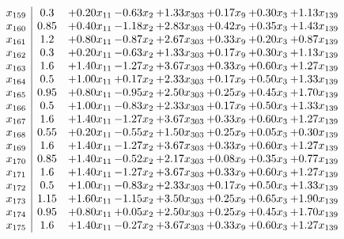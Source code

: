 \documentclass[8pt]{article}
\begin{document}
\[\begin{array}{c| c c@{\hskip 2pt} c@{\hskip 2pt} c@{\hskip 2pt} c@{\hskip 2pt} c@{\hskip 2pt} c@{\hskip 2pt} }
 x_{159}   &  0.3 & +  0.20 x_{11} & -0.63 x_{2} & +  1.33 x_{303} & +  0.17 x_{9} & +  0.30 x_{3} & +  1.13 x_{139}\\
 x_{160}   &  0.85 & +  0.40 x_{11} & -1.18 x_{2} & +  2.83 x_{303} & +  0.42 x_{9} & +  0.35 x_{3} & +  1.43 x_{139}\\
 x_{161}   &  1.2 & +  0.80 x_{11} & -0.87 x_{2} & +  2.67 x_{303} & +  0.33 x_{9} & +  0.20 x_{3} & +  0.87 x_{139}\\
 x_{162}   &  0.3 & +  0.20 x_{11} & -0.63 x_{2} & +  1.33 x_{303} & +  0.17 x_{9} & +  0.30 x_{3} & +  1.13 x_{139}\\
 x_{163}   &  1.6 & +  1.40 x_{11} & -1.27 x_{2} & +  3.67 x_{303} & +  0.33 x_{9} & +  0.60 x_{3} & +  1.27 x_{139}\\
 x_{164}   &  0.5 & +  1.00 x_{11} & +  0.17 x_{2} & +  2.33 x_{303} & +  0.17 x_{9} & +  0.50 x_{3} & +  1.33 x_{139}\\
 x_{165}   &  0.95 & +  0.80 x_{11} & -0.95 x_{2} & +  2.50 x_{303} & +  0.25 x_{9} & +  0.45 x_{3} & +  1.70 x_{139}\\
 x_{166}   &  0.5 & +  1.00 x_{11} & -0.83 x_{2} & +  2.33 x_{303} & +  0.17 x_{9} & +  0.50 x_{3} & +  1.33 x_{139}\\
 x_{167}   &  1.6 & +  1.40 x_{11} & -1.27 x_{2} & +  3.67 x_{303} & +  0.33 x_{9} & +  0.60 x_{3} & +  1.27 x_{139}\\
 x_{168}   &  0.55 & +  0.20 x_{11} & -0.55 x_{2} & +  1.50 x_{303} & +  0.25 x_{9} & +  0.05 x_{3} & +  0.30 x_{139}\\
 x_{169}   &  1.6 & +  1.40 x_{11} & -1.27 x_{2} & +  3.67 x_{303} & +  0.33 x_{9} & +  0.60 x_{3} & +  1.27 x_{139}\\
 x_{170}   &  0.85 & +  1.40 x_{11} & -0.52 x_{2} & +  2.17 x_{303} & +  0.08 x_{9} & +  0.35 x_{3} & +  0.77 x_{139}\\
 x_{171}   &  1.6 & +  1.40 x_{11} & -1.27 x_{2} & +  3.67 x_{303} & +  0.33 x_{9} & +  0.60 x_{3} & +  1.27 x_{139}\\
 x_{172}   &  0.5 & +  1.00 x_{11} & -0.83 x_{2} & +  2.33 x_{303} & +  0.17 x_{9} & +  0.50 x_{3} & +  1.33 x_{139}\\
 x_{173}   &  1.15 & +  1.60 x_{11} & -1.15 x_{2} & +  3.50 x_{303} & +  0.25 x_{9} & +  0.65 x_{3} & +  1.90 x_{139}\\
 x_{174}   &  0.95 & +  0.80 x_{11} & +  0.05 x_{2} & +  2.50 x_{303} & +  0.25 x_{9} & +  0.45 x_{3} & +  1.70 x_{139}\\
 x_{175}   &  1.6 & +  1.40 x_{11} & -0.27 x_{2} & +  3.67 x_{303} & +  0.33 x_{9} & +  0.60 x_{3} & +  1.27 x_{139}\\

\end{array}\]
\end{document}
